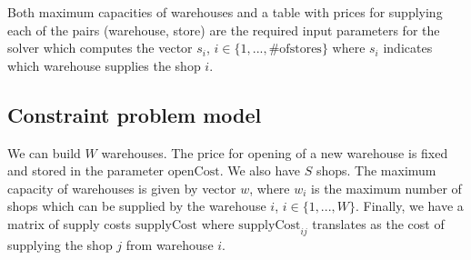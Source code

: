 Both maximum capacities of warehouses and a table with
prices for supplying each of the pairs (warehouse, store) are the required input parameters for the solver which computes the vector
 $s_i$, $i \in \{1,...,\#\mathrm{ of stores}\}$ where $s_i$ indicates which warehouse
 supplies the shop $i$.

\subsection{Constraint problem model}
We can build $W$ warehouses. The price for opening of a new warehouse is fixed and 
stored in the parameter $\mathrm{openCost}$. We also have $S$ shops. The maximum capacity
of warehouses is given by vector $w$, where $w_i$ is the maximum number of shops which
can be supplied by the warehouse $i$, $i \in \{1,...,W\}$.
Finally, we have a matrix of supply costs $\mathrm{supplyCost}$ where $\mathrm{supplyCost}_{ij}$ 
translates as the cost of supplying the shop $j$ from warehouse $i$.

